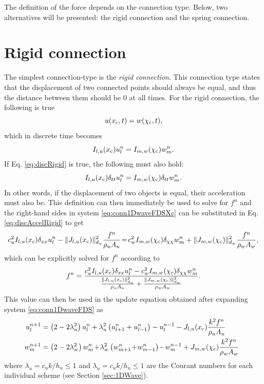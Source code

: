 The definition of the force depends on the connection type. Below, two alternatives will be presented: the rigid connection and the spring connection. 

\section{Rigid connection}\label{sec:rigidConn}
The simplest connection-type is the \textit{rigid connection}. This connection type states that the displacement of two connected points should always be equal, and thus the distance between them should be 0 at all times. 
For the rigid connection, the following is true
\begin{equation}\label{eq:contRigid}
    u(x_{\text{c}}, t) = w(\chi_{\text{c}}, t),
\end{equation}
which in discrete time becomes
\begin{equation}\label{eq:discRigid}
    I_{l, u}(x_{\text{c}})u_l^n = I_{m, w}(\chi_{\text{c}})w_m^n.
\end{equation}
If Eq. \eqref{eq:discRigid} is true, the following must also hold:
\begin{equation}\label{eq:discAccelRigid}
    I_{l, u}(x_{\text{c}})\delta_{tt}u_l^n = I_{m, w}(\chi_{\text{c}})\delta_{tt}w_m^n.
\end{equation}
In other words, if the displacement of two objects is equal, their acceleration must also be. This definition can then immediately be used to solve for $f^n$ and the right-hand sides in system \eqref{eq:conn1DwaveFDSXc} can be substituted in Eq. \eqref{eq:discAccelRigid} to get
\begin{equation*}
    c_u^2 I_{l, u}(x_{\text{c}})\delta_{xx} u_l^n -\lVert J_{l, u}(x_{\text{c}})\rVert_{d_u}^2\frac{f^n}{\rho_u A_u}
    \!=\! c_w^2 I_{m, w}(\chi_{\text{c}})\delta_{\chi\chi} w_m^n + \lVert J_{m, w}(\chi_{\text{c}})\rVert_{d_w}^2\frac{f^n}{\rho_w A_w},
\end{equation*}
which can be explicitly solved for $f^n$ according to
\begin{equation}\label{eq:rigidForce}
    f^n = \frac{c_u^2 I_{l, u}(x_{\text{c}})\delta_{xx} u_l^n - c_w^2 I_{m, w}(\chi_{\text{c}})\delta_{\chi\chi} w_m^n}{\frac{\lVert J_{l, u}(x_{\text{c}})\rVert_{d_u}^2}{\rho_u A_u} + \frac{\lVert J_{m, w}(\chi_{\text{c}})\rVert_{d_w}^2}{\rho_w A_w}}.
\end{equation}
This value can then be used in the update equation obtained after expanding system \eqref{eq:conn1DwaveFDS} as
\begin{subequations}
    \begin{align}
        \!\!\!u_l^{n+1} &= \left(2-2\lambda_u^2\right) \uln  + \lambda_u^2\left(u_{l+1}^n + u_{l-1}^n\right) - u_l^{n-1} -\Ju\frac{k^2 f^n}{\rho_u A_u}\\
        \!\!\!w_m^{n+1} &= \left(2-2\lambda_w^2\right) \wmn\! +\! \lambda_w^2\left(w_{m+1}^n\! +\! w_{m-1}^n\right) \! -\! w_m^{n-1} +\Jw\frac{k^2 f^n}{\rho_w A_w}
    \end{align}
\end{subequations}
where $\lambda_u = c_uk/h_u \leq 1$ and  $\lambda_u = c_uk/h_u \leq 1$ are the Courant numbers for each individual scheme (see Section \ref{sec:1DWave}).

